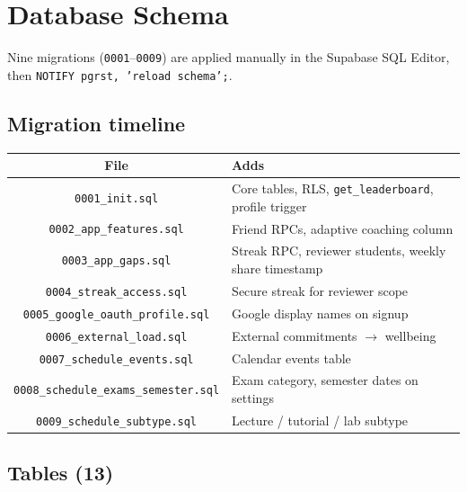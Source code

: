 \documentclass[11pt,a4paper]{article}
\newcommand{\filepath}[1]{\texttt{#1}}
\begin{document}
\section{Database Schema}

Nine migrations (\filepath{0001}--\filepath{0009}) are applied manually in the Supabase SQL
Editor, then \texttt{NOTIFY pgrst, 'reload schema';}.

\subsection{Migration timeline}

\begin{table}[h]
\centering
\small
\begin{tabular}{@{}cl@{}}
\toprule
\textbf{File} & \textbf{Adds} \\
\midrule
\filepath{0001\_init.sql} & Core tables, RLS, \texttt{get\_leaderboard}, profile trigger \\
\filepath{0002\_app\_features.sql} & Friend RPCs, adaptive coaching column \\
\filepath{0003\_app\_gaps.sql} & Streak RPC, reviewer students, weekly share timestamp \\
\filepath{0004\_streak\_access.sql} & Secure streak for reviewer scope \\
\filepath{0005\_google\_oauth\_profile.sql} & Google display names on signup \\
\filepath{0006\_external\_load.sql} & External commitments $\rightarrow$ wellbeing \\
\filepath{0007\_schedule\_events.sql} & Calendar events table \\
\filepath{0008\_schedule\_exams\_semester.sql} & Exam category, semester dates on settings \\
\filepath{0009\_schedule\_subtype.sql} & Lecture / tutorial / lab subtype \\
\bottomrule
\end{tabular}
\end{table}

\subsection{Tables (13)}
\end{document}
